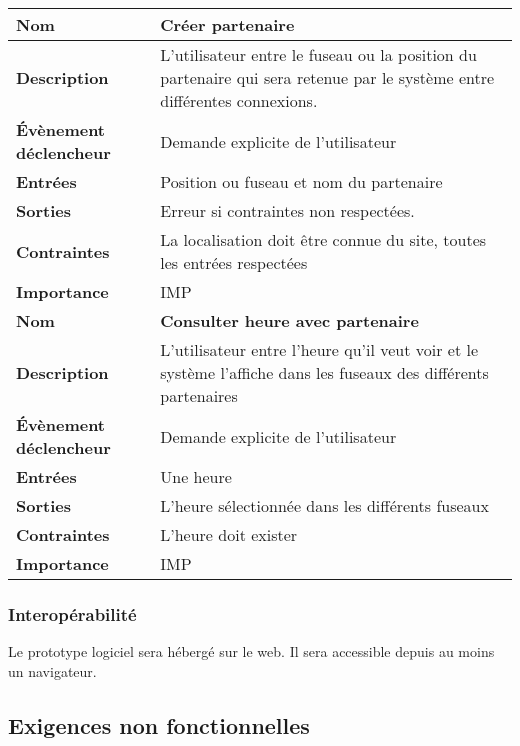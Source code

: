 \documentclass[majeure,gl]{tb}
\begin{document}
 \begin{table}[ht]
  \centering
  \begin{tabular}[c]{|p{3cm}|p{13cm}|}

\hline
 \textbf{Nom} &
 \textbf{Créer partenaire}
 \\\hline
 \textbf{Description} &
 L'utilisateur entre le fuseau ou la position du partenaire qui sera retenue par le système entre différentes connexions.
 \\\hline
 \textbf{Évènement déclencheur} &
 Demande explicite de l'utilisateur
 \\\hline
 
 \textbf{Entrées} &
 Position ou fuseau et nom du partenaire
 \\\hline
 \textbf{Sorties} &
 Erreur si contraintes non respectées.
 \\\hline
 \textbf{Contraintes} &
 La localisation doit être connue du site, toutes les entrées respectées
 \\\hline
 \textbf{Importance} &
 IMP
 \\\hline 
 
 \hline
 \textbf{Nom} &
 \textbf{Consulter heure avec partenaire}
 \\\hline
 \textbf{Description} &
 L'utilisateur entre l'heure qu'il veut voir et le système l'affiche dans les fuseaux des différents partenaires
 \\\hline
 \textbf{Évènement déclencheur} &
 Demande explicite de l'utilisateur
 \\\hline
 
 \textbf{Entrées} &
 Une heure
 \\\hline
 \textbf{Sorties} &
 L'heure sélectionnée dans les différents fuseaux
 \\\hline
 \textbf{Contraintes} &
 L'heure doit exister
 \\\hline
 \textbf{Importance} &
 IMP
 \\\hline 

    
          \end{tabular}
\end{table}


\subsubsection{Interopérabilité}
Le prototype logiciel sera hébergé sur le web. Il sera accessible depuis au moins un navigateur.

\subsection{Exigences non fonctionnelles}
\label{nonfonc}
\end{document}
